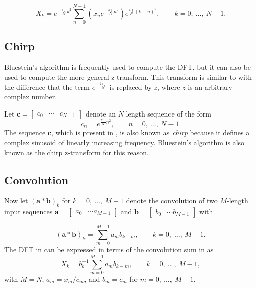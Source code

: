\documentclass[11pt]{scrartcl}
\begin{document}
\begin{equation}
X_k = e^{-\frac{\pi \jmath}{N}k^2} \sum_{n=0}^{N-1}{\left( x_n e^{-\frac{\pi \jmath}{N}n^2} \right) e^{\frac{\pi \jmath}{N}  (k-n)^2}{}}, \qquad k = 0, \ \ldots, \ N-1.
\label{eq:bluestein_dft}	
\end{equation}

\subsection{Chirp}
Bluestein's algorithm is frequently used to compute the DFT, but it can also be used to compute the more general z-transform. This transform is similar to  with the difference that the term $e^{-\frac{2\pi \jmath}{N}}$ is replaced by $z$, where $z$ is an arbitrary complex number. 

Let $\mathbf{c} = \begin{bmatrix} c_0 & \cdots & c_{N-1} \end{bmatrix}$ denote an $N$ length sequence of the form
\begin{equation}
c_n = e^{\frac{\pi \jmath}{N}n^2}, \qquad n = 0, \ \ldots, \ N-1.
\label{eq:chirp}
\end{equation}
The sequence $\mathbf{c}$, which is present in , is also known as \emph{chirp} because it defines a complex sinusoid of linearly increasing frequency. Bluestein's algorithm is also known as the chirp z-transform for this reason.

\subsection{Convolution}

Now let $\left(\mathbf{a} \ast \mathbf{b}\right)_k$ for $k = 0, \ \ldots, \ M-1$ denote the convolution of two $M$-length input sequences $\mathbf{a} = \begin{bmatrix} a_0 & \cdots a_{M-1} \end{bmatrix}$ and $\mathbf{b} = \begin{bmatrix} b_0 & \cdots b_{M-1} \end{bmatrix} $ with

\begin{equation}
\left(\mathbf{a} \ast \mathbf{b} \right)_k = \sum_{m=0}^{M-1}a_m b_{k-m}, \qquad k = 0, \ \ldots, \ M-1.
\label{eq:convolution_definition}	
\end{equation}
The DFT in  can be expressed in terms of the convolution sum in  as
\begin{equation}
X_k = b_k^{-1} \sum_{m=0}^{M-1}{a_m b_{k-m}}, \qquad k = 0, \ \ldots, \ M-1,
\label{eq:bluestein_convolution}
\end{equation}
with $M=N$, $a_m = x_m / c_m$, and $b_m = c_m$ for $m = 0, \ \ldots, \ M-1$.
\end{document}
